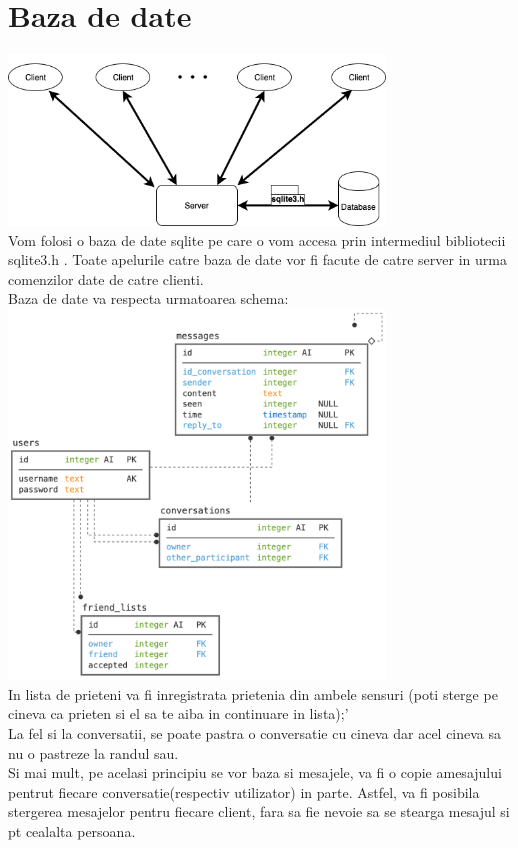\documentclass[runningheads]{llncs}
\begin{document}
\section{Baza de date}
\includegraphics[width=100mm,scale=1]{retele_pics/general_diagram.png}\\
Vom folosi o baza de date sqlite pe care o vom accesa prin intermediul bibliotecii sqlite3.h . Toate apelurile catre baza de date vor fi facute de catre server in urma comenzilor date de catre clienti.\\
Baza de date va respecta urmatoarea schema:\\
\includegraphics[width=100mm,scale=1]{retele_pics/database_schemas/diagram_light.png}\\
In lista de prieteni va fi inregistrata prietenia din ambele sensuri (poti sterge pe cineva ca prieten si el sa te aiba in continuare in lista);'\\
La fel si la conversatii, se poate pastra o conversatie cu cineva dar acel cineva sa nu o pastreze la randul sau.\\
Si mai mult, pe acelasi principiu se vor baza si mesajele, va fi o copie amesajului pentrut fiecare conversatie(respectiv utilizator) in parte. Astfel, va fi posibila stergerea mesajelor pentru fiecare client, fara sa fie nevoie sa se stearga mesajul si pt cealalta persoana. \\
\end{document}
